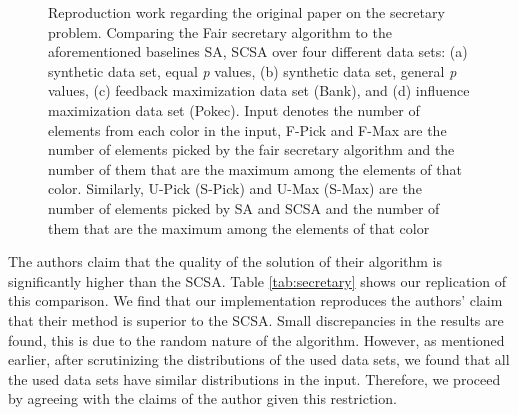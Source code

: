 \begin{figure}[h!]
    \caption[]
    {\small Reproduction work regarding the original paper on the secretary problem. Comparing the Fair secretary algorithm to the aforementioned baselines SA, SCSA over four different data sets: (a) synthetic data set, equal \textit{p} values, (b) synthetic data set, general \textit{p} values, (c) feedback maximization data set (Bank), and (d) influence maximization data set (Pokec). Input denotes the number of elements from each color in the input, F-Pick and F-Max are the number of elements picked by the fair secretary algorithm and the number of them that are the maximum among the elements of that color. Similarly, U-Pick (S-Pick) and U-Max (S-Max) are the number of elements picked by SA and SCSA and the number of them that are the maximum among the elements of that color }
    \label{fig:sa_plots}
\end{figure}

The authors claim that the quality of the solution of their algorithm is significantly higher than the SCSA. Table \ref{tab:secretary} shows our replication of this comparison. We find that our implementation reproduces the authors' claim that their method is superior to the SCSA. Small discrepancies in the results are found, this is due to the random nature of the algorithm. However, as mentioned earlier, after scrutinizing the distributions of the used data sets, we found that all the used data sets have similar distributions in the input. Therefore, we proceed by agreeing with the claims of the author given this restriction.

\begin{table}[h]
\centering
{}
\caption{Secretary experiment claims by the author compared to reproduced results.}
\label{tab:secretary}
\end{table}


